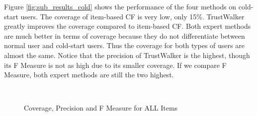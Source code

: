 \documentclass[12pt]{article}
\begin{document}
Figure \ref{fig:sub_results_cold} shows the performance of the four methods on cold-start users. The coverage of item-based CF is very low, only 15\%. TrustWalker greatly improves the coverage compared to item-based CF. Both expert methods are much better in terms of coverage because they do not differentiate between normal user and cold-start users. Thus the coverage for both types of users are almost the same. Notice that the precision of TrustWalker is the highest, though its F Measure is not as high due to its smaller coverage. If we compare F Measure, both expert methods are still the two highest.


\begin{figure}[htbp]
	\centering
	\\
	\caption{Coverage, Precision and F Measure for ALL Items}
	\label{fig:results_all}
\end{figure}
\end{document}
